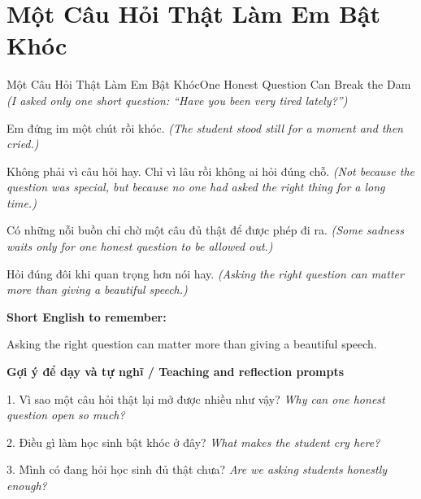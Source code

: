 \section{Một Câu Hỏi Thật Làm Em Bật Khóc}
\begin{truyen}{Một Câu Hỏi Thật Làm Em Bật Khóc}{One Honest Question Can Break the Dam}
\textit{(I asked only one short question: “Have you been very tired lately?”)}

Em đứng im một chút rồi khóc.
\textit{(The student stood still for a moment and then cried.)}

Không phải vì câu hỏi hay. Chỉ vì lâu rồi không ai hỏi đúng chỗ.
\textit{(Not because the question was special, but because no one had asked the right thing for a long time.)}

Có những nỗi buồn chỉ chờ một câu đủ thật để được phép đi ra.
\textit{(Some sadness waits only for one honest question to be allowed out.)}

\end{truyen}

\begin{baihoc}
Hỏi đúng đôi khi quan trọng hơn nói hay.
\textit{(Asking the right question can matter more than giving a beautiful speech.)}
\end{baihoc}

\begin{ghinhoanh}
\textbf{Short English to remember:}

Asking the right question can matter more than giving a beautiful speech.

\end{ghinhoanh}

\begin{tuhocnhanh}
\textbf{Gợi ý để dạy và tự nghĩ / Teaching and reflection prompts}

1. Vì sao một câu hỏi thật lại mở được nhiều như vậy? \textit{Why can one honest question open so much?}

2. Điều gì làm học sinh bật khóc ở đây? \textit{What makes the student cry here?}

3. Mình có đang hỏi học sinh đủ thật chưa? \textit{Are we asking students honestly enough?}
\end{tuhocnhanh}
